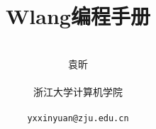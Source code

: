 ﻿%
%


\title{\bf \Huge Wlang编程手册}
\author{ \\ \LARGE { 袁昕} \\
       \\
       { 浙江大学计算机学院} \\ \\
       \texttt{yxxinyuan@zju.edu.cn}
}
\date{}

\maketitle
